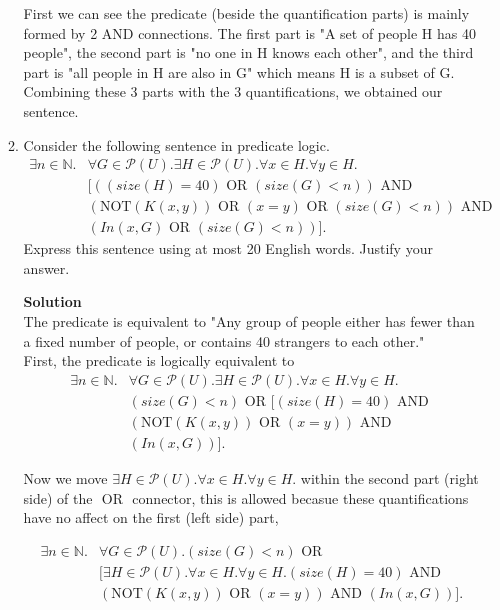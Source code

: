 \documentclass[12pt]{article}
\newcommand{\nnot}{\mathrm{NOT}}
\newcommand{\aand}{\,\,\mathrm{AND}\,\,}
\newcommand{\oor}{\,\,\mathrm{OR}\,\,}
\begin{document}
\begin{enumerate}
\begin{enumerate}
First we can see the predicate (beside the quantification parts) is mainly formed by 2 AND connections. The first part is "A set of people H has 40 people", the second part is "no one in H knows each other", and the third part is "all people in H are also in G" which means H is a subset of G. Combining these 3 parts with the 3 quantifications, we obtained our sentence. 

\item
Consider the following sentence in predicate logic.
\begin{align*}
\exists n \in \mathbb{N}. & \forall G \in \mathcal{P}(U). \exists H \in \mathcal{P}(U). \forall x \in H. \forall y \in H.\\
& [((size(H)= 40) \oor  (size(G)  < n)) \aand \\ & (\nnot(K(x,y)) \oor (x=y) \oor (size(G)  < n)) \aand \\ & (In(x ,G) \oor  (size(G)  < n))].
\end{align*}
Express this sentence using at most 20 English words.
Justify your answer. 
 
\vspace{.25in}\textbf{Solution}\vspace{.10in}\\

The predicate is equivalent to "Any group of people either has fewer than a fixed number of people, or contains 40 strangers to each other."
\\
 First, the predicate is logically equivalent to 
\begin{align*}
\exists n \in \mathbb{N}. & \forall G \in \mathcal{P}(U). \exists H \in \mathcal{P}(U). \forall x \in H. \forall y \in H.\\
& (size(G)  < n) \oor [(size(H) = 40) \aand \\ & (\nnot(K(x,y)) \oor (x=y)) \aand \\ & (In(x ,G))].
\end{align*}

Now we move $\exists H \in \mathcal{P}(U). \forall x \in H. \forall y \in H.$ within the second part (right side) of the $\oor$ connector, this is allowed becasue these quantifications have no affect on the first (left side) part,

\begin{align*}
    \exists n \in \mathbb{N}. & \forall G \in \mathcal{P}(U). (size(G)  < n) \oor \\ & [\exists H \in \mathcal{P}(U). \forall x \in H. \forall y \in H. (size(H) = 40) \aand  \\ & (\nnot(K(x,y)) \oor (x=y)) \aand (In(x ,G))].
\end{align*}


\end{enumerate}
\end{enumerate}
\end{document}
